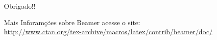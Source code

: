\begin{frame}
  \begin{center}
    Obrigado!!
  \end{center}

  \begin{block}{}
    \begin{center}
      Mais Inforamções sobre Beamer acesse o site: \\
      {\scriptsize
      \hyperref[http://www.ctan.org/tex-archive/macros/latex/contrib/beamer/doc/]{http://www.ctan.org/tex-archive/macros/latex/contrib/beamer/doc/}}
    \end{center}
 \end{block}

\end{frame}
